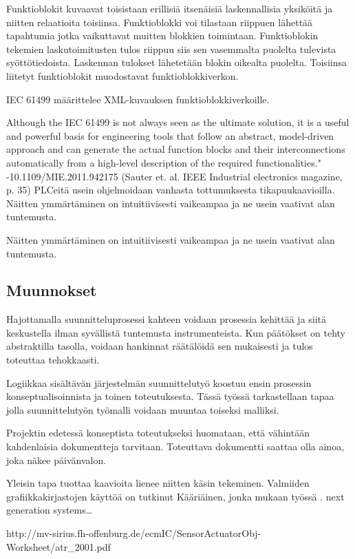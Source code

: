 \documentclass[finnish,12pt]{article}
\begin{document}
Funktioblokit kuvaavat toisistaan erillisiä itsenäisiä laskennallisia yksiköitä ja niitten relaatioita toisiinsa. Funktioblokki voi tilastaan riippuen lähettää tapahtumia jotka vaikuttavat muitten blokkien toimintaan. Funktioblokin tekemien laskutoimitusten tulos riippuu siis sen vasemmalta puolelta tulevista syöttötiedoista. Laskennan tulokset lähetetään blokin oikealta puolelta. Toisiinsa liitetyt funktioblokit muodostavat funktioblokkiverkon. 

IEC 61499 määrittelee XML-kuvauksen funktioblokkiverkoille.

Although the IEC 61499 is not always seen as the ultimate solution, it is a useful and powerful basis for engineering tools that follow an abstract, model-driven approach and can generate the actual function blocks and their interconnections automatically from a high-level description of the required functionalities." -10.1109/MIE.2011.942175 (Sauter et. al. IEEE Industrial electronics magazine, p. 35)
PLCeitä usein ohjelmoidaan vanhasta tottumuksesta tikapuukaavioilla.
Näitten ymmärtäminen on intuitiivisesti vaikeampaa ja ne usein vaativat alan tuntemusta.


Näitten ymmärtäminen on intuitiivisesti vaikeampaa ja ne usein vaativat alan tuntemusta.

		\subsection{Muunnokset}

Hajottamalla suunnitteluprosessi kahteen voidaan prosessia kehittää ja siitä keskustella ilman syvällistä tuntemusta instrumenteista.
Kun päätökset on tehty abstraktilla tasolla, voidaan hankinnat räätälöidä sen mukaisesti ja tulos toteuttaa tehokkaasti.

Logiikkaa sisältävän järjestelmän suunnittelutyö koostuu ensin prosessin konseptualisoinnista ja toinen toteutuksesta.
Tässä työssä tarkastellaan tapaa jolla suunnittelutyön työmalli voidaan muuntaa toiseksi malliksi.

Projektin edetessä konseptista toteutukseksi huomataan, että vähintään kahdenlaisia dokumentteja tarvitaan.
Toteuttava dokumentti saattaa olla ainoa, joka näkee päivänvalon. 

Yleisin tapa tuottaa kaavioita lienee niitten käsin tekeminen.
Valmiiden grafiikkakirjastojen käyttöä on tutkinut Kääriäinen, jonka mukaan työssä .
next generation systems…

http://mv-sirius.fh-offenburg.de/ecmIC/SensorActuatorObj-Worksheet/atr_2001.pdf
\makeindex %
 
\end{document}

